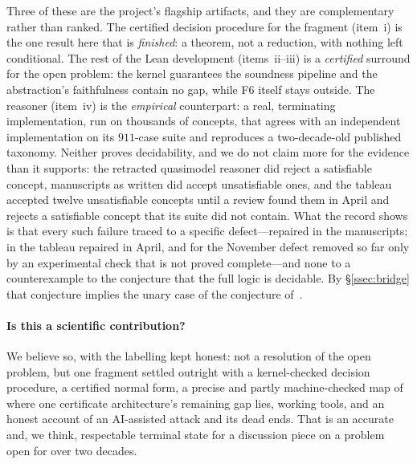 \documentclass[11pt]{article}
\theoremstyle{plain}
\theoremstyle{definition}
\begin{document}
Three of these are the project's flagship artifacts, and they are
complementary rather than ranked. The certified decision procedure for the
fragment (item~i) is the one result here that is \emph{finished}: a theorem,
not a reduction, with nothing left conditional. The rest of the Lean
development (items~ii--iii) is a \emph{certified} surround for the open
problem: the kernel guarantees the soundness pipeline and the abstraction's
faithfulness contain no gap, while F6 itself stays outside. The
reasoner (item~iv) is the \emph{empirical} counterpart: a real,
terminating implementation, run on thousands of concepts, that agrees with
an independent implementation on its $911$-case suite and reproduces
a two-decade-old published taxonomy. Neither proves decidability, and we
do not claim more for the evidence than it supports: the retracted quasimodel
reasoner did reject a satisfiable concept, manuscripts as written did accept
unsatisfiable ones, and the tableau accepted twelve unsatisfiable concepts
until a review found them in April and rejects a satisfiable concept that its
suite did not contain. What the record shows is that every such failure traced
to a specific defect---repaired in the manuscripts; in the tableau repaired in
April, and for the November defect removed so far only by an experimental
check that is not proved complete---and none to a counterexample to the
conjecture that the full logic is decidable. By \S\ref{ssec:bridge} that
conjecture implies the unary case of the conjecture
of~\cite{MarzecTendera2026}.

\paragraph{Is this a scientific contribution?} We believe so, with the
labelling kept honest: not a resolution of the open problem, but one
fragment settled outright with a kernel-checked decision procedure, a
certified normal form, a precise and partly machine-checked map of where one
certificate architecture's remaining gap lies, working tools, and an honest
account of an AI-assisted attack and its dead ends. That is
an accurate and, we think, respectable terminal state for a discussion
piece on a problem open for over two decades.
\end{document}
